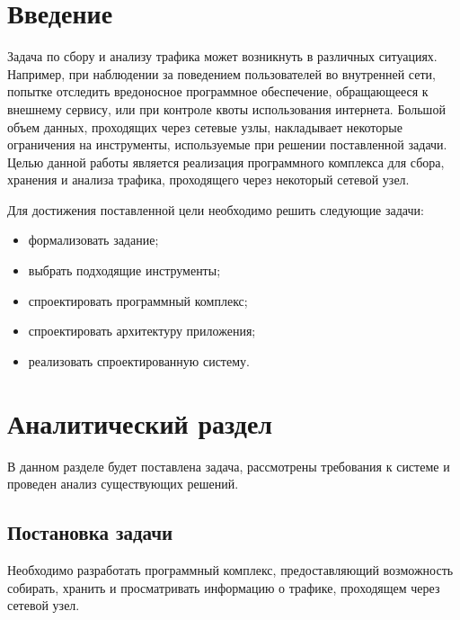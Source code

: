 
\usepackage{enumitem}
\usepackage{indentfirst}
\usepackage{gensymb}
\usepackage{enumerate}
\usepackage{float}


\graphicspath{{images/}}


\setcounter{page}{3}

\clearpage
\tableofcontents

\clearpage
\section*{Введение}
Задача по сбору и анализу трафика может возникнуть в различных ситуациях. Например, при наблюдении за поведением пользователей во внутренней сети, попытке отследить вредоносное программное обеспечение, обращающееся к внешнему сервису, или при контроле квоты использования интернета. Большой объем данных, проходящих через сетевые узлы, накладывает некоторые ограничения на инструменты, используемые при решении поставленной задачи.
	\\ Целью данной работы является реализация программного комплекса для сбора, хранения и анализа трафика, проходящего через некоторый сетевой узел.

Для достижения поставленной цели необходимо решить следующие задачи:
\begin{itemize}
	\item формализовать задание;
	\item выбрать подходящие инструменты;
	\item спроектировать программный комплекс;
	\item спроектировать архитектуру приложения;
	\item реализовать спроектированную систему.
\end{itemize}

\clearpage
\section{Аналитический раздел}
В данном разделе будет поставлена задача, рассмотрены требования к системе и проведен анализ существующих решений.

\subsection{Постановка задачи}
Необходимо разработать программный комплекс, предоставляющий возможность собирать, хранить и просматривать информацию о трафике, проходящем через сетевой узел.

